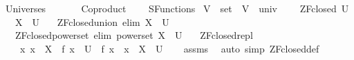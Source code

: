 %
\begin{isabellebody}%
%
%
\isadelimdocument
%
\endisadelimdocument
%
\isatagdocument
\isanewline
%
\isamarkuptrue%
%
\endisatagdocument
{\isafolddocument}%
%
\isadelimdocument
%
\endisadelimdocument
%
\isadelimtheory
%
\endisadelimtheory
%
\isatagtheory
{}\isamarkupfalse%
\ Universes\isanewline
\ \ \isanewline
\ \ \ \ Coproduct\isanewline
\ \ \ \ SFunctions\isanewline
{}%
\endisatagtheory
{\isafoldtheory}%
%
\isadelimtheory
\isanewline
%
\endisadelimtheory
\isanewline
{}\isamarkupfalse%
\ V\ {\isacharcolon}{\kern0pt}{\isacharcolon}{\kern0pt}\ set\ \ {\isachardoublequoteopen}V\ {\isasymequiv}\ univ\ {\isacharbraceleft}{\kern0pt}{\isacharbraceright}{\kern0pt}{\isachardoublequoteclose}\isanewline
\isanewline
{}\isamarkupfalse%
\isanewline
\ \ \ {\isachardoublequoteopen}ZF{\isacharunderscore}{\kern0pt}closed\ U{\isachardoublequoteclose}\isanewline
\ \ \ {\isachardoublequoteopen}X\ {\isasymin}\ U{\isachardoublequoteclose}\isanewline
\ \ \ ZF{\isacharunderscore}{\kern0pt}closed{\isacharunderscore}{\kern0pt}union\ {\isacharbrackleft}{\kern0pt}elim{\isacharbang}{\kern0pt}{\isacharbrackright}{\kern0pt}{\isacharcolon}{\kern0pt}\ {\isachardoublequoteopen}{\isasymUnion}X\ {\isasymin}\ U{\isachardoublequoteclose}\isanewline
\ \ \ ZF{\isacharunderscore}{\kern0pt}closed{\isacharunderscore}{\kern0pt}powerset\ {\isacharbrackleft}{\kern0pt}elim{\isacharbang}{\kern0pt}{\isacharbrackright}{\kern0pt}{\isacharcolon}{\kern0pt}\ {\isachardoublequoteopen}powerset\ X\ {\isasymin}\ U{\isachardoublequoteclose}\isanewline
\ \ \ ZF{\isacharunderscore}{\kern0pt}closed{\isacharunderscore}{\kern0pt}repl{\isacharcolon}{\kern0pt}\isanewline
\ \ \ \ {\isachardoublequoteopen}{\isacharparenleft}{\kern0pt}{\isasymAnd}x{\isachardot}{\kern0pt}\ x\ {\isasymin}\ X\ {\isasymLongrightarrow}\ f\ x\ {\isasymin}\ U{\isacharparenright}{\kern0pt}\ {\isasymLongrightarrow}\ {\isacharbraceleft}{\kern0pt}f\ x\ {\isacharbar}{\kern0pt}\ x\ {\isasymin}\ X{\isacharbraceright}{\kern0pt}\ {\isasymin}\ U{\isachardoublequoteclose}\isanewline
%
\isadelimproof
\ \ %
\endisadelimproof
%
\isatagproof
{}\isamarkupfalse%
\ assms\ \isamarkupfalse%
\ {\isacharparenleft}{\kern0pt}auto\ simp{\isacharcolon}{\kern0pt}\ ZF{\isacharunderscore}{\kern0pt}closed{\isacharunderscore}{\kern0pt}def{\isacharparenright}{\kern0pt}%

\end{isabellebody}
